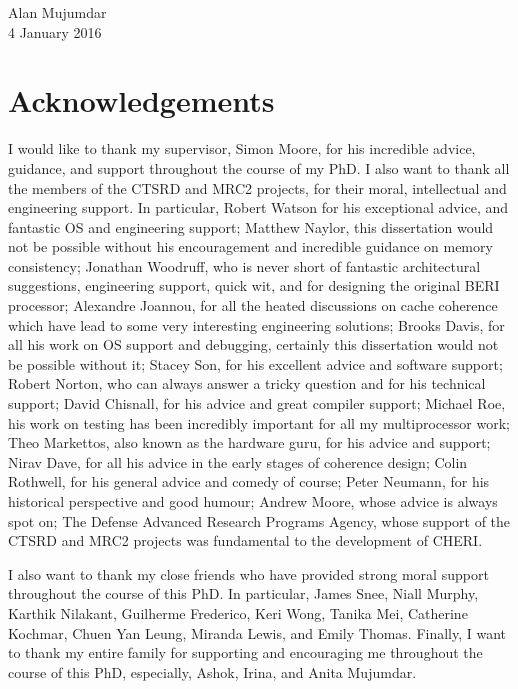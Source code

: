 \documentclass[twoside,openright,12pt]{Classes/CUEDthesisPSnPDF}
\begin{document}
\vspace{15mm}

\begin{flushright}
Alan Mujumdar
\\
4 January 2016
\end{flushright}
\vfill


\clearpage
\thispagestyle{empty}
\mbox{}

\chapter*{Acknowledgements}
\thispagestyle{empty}

I would like to thank my supervisor, Simon Moore, for his incredible advice, guidance, and support throughout the course of my PhD. I also want to thank all the members of the CTSRD and MRC2 projects, for their moral, intellectual and engineering support. 
In particular, Robert Watson for his exceptional advice, and fantastic OS and engineering support;
Matthew Naylor, this dissertation would not be possible without his encouragement and incredible guidance on memory consistency;
Jonathan Woodruff, who is never short of fantastic architectural suggestions, engineering support, quick wit, and for designing the original BERI processor;
Alexandre Joannou, for all the heated discussions on cache coherence which have lead to some very interesting engineering solutions;
Brooks Davis, for all his work on OS support and debugging, certainly this dissertation would not be possible without it;
Stacey Son, for his excellent advice and software support;
Robert Norton, who can always answer a tricky question and for his technical support;
David Chisnall, for his advice and great compiler support;
Michael Roe, his work on testing has been incredibly important for all my multiprocessor work;
Theo Markettos, also known as the hardware guru, for his advice and support;
Nirav Dave, for all his advice in the early stages of coherence design;
Colin Rothwell, for his general advice and comedy of course;
Peter Neumann, for his historical perspective and good humour;
Andrew Moore, whose advice is always spot on;
The Defense Advanced Research Programs Agency, whose support of
the CTSRD and MRC2 projects was fundamental to the development of CHERI.

I also want to thank my close friends who have provided strong moral support throughout the course of this PhD. In particular, James Snee, Niall Murphy, Karthik Nilakant, Guilherme Frederico, Keri Wong, Tanika Mei, Catherine Kochmar, Chuen Yan Leung, Miranda Lewis, and Emily Thomas. Finally, I want to thank my entire family for supporting and encouraging me throughout the course of this PhD, especially, Ashok, Irina, and Anita Mujumdar.
\end{document}
